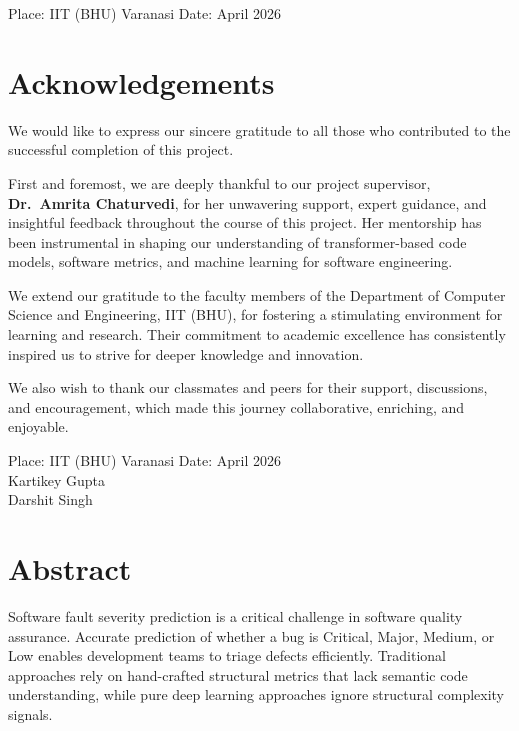\documentclass[12pt, a4paper]{report}
\begin{document}
\vspace{1cm}
\noindent
Place: IIT (BHU) Varanasi \hfill Date: April 2026

\clearpage
\chapter*{Acknowledgements}
\thispagestyle{plain}
We would like to express our sincere gratitude to all those who contributed to the successful completion of this project.

First and foremost, we are deeply thankful to our project supervisor, \textbf{Dr.\ Amrita Chaturvedi}, for her unwavering support, expert guidance, and insightful feedback throughout the course of this project. Her mentorship has been instrumental in shaping our understanding of transformer-based code models, software metrics, and machine learning for software engineering.

We extend our gratitude to the faculty members of the Department of Computer Science and Engineering, IIT (BHU), for fostering a stimulating environment for learning and research. Their commitment to academic excellence has consistently inspired us to strive for deeper knowledge and innovation.

We also wish to thank our classmates and peers for their support, discussions, and encouragement, which made this journey collaborative, enriching, and enjoyable.

\vspace{1cm}
\noindent
Place: IIT (BHU) Varanasi \hfill Date: April 2026\\[0.5cm]
\hfill Kartikey Gupta\\
\hfill Darshit Singh

\clearpage
\chapter*{Abstract}
\thispagestyle{plain}
Software fault severity prediction is a critical challenge in software quality assurance. Accurate prediction of whether a bug is Critical, Major, Medium, or Low enables development teams to triage defects efficiently. Traditional approaches rely on hand-crafted structural metrics that lack semantic code understanding, while pure deep learning approaches ignore structural complexity signals.
\end{document}
